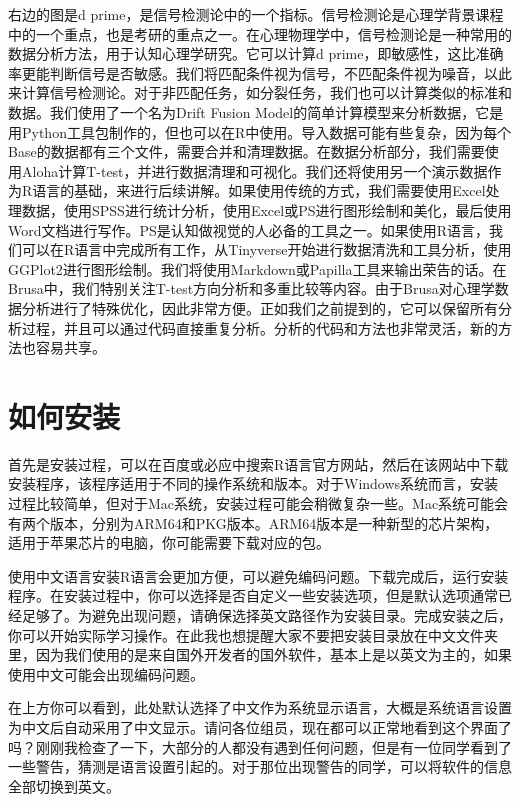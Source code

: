 \documentclass[
  oneside]{book}
\begin{document}
右边的图是d
prime，是信号检测论中的一个指标。信号检测论是心理学背景课程中的一个重点，也是考研的重点之一。在心理物理学中，信号检测论是一种常用的数据分析方法，用于认知心理学研究。它可以计算d
prime，即敏感性，这比准确率更能判断信号是否敏感。我们将匹配条件视为信号，不匹配条件视为噪音，以此来计算信号检测论。对于非匹配任务，如分裂任务，我们也可以计算类似的标准和数据。我们使用了一个名为Drift
Fusion
Model的简单计算模型来分析数据，它是用Python工具包制作的，但也可以在R中使用。导入数据可能有些复杂，因为每个Base的数据都有三个文件，需要合并和清理数据。在数据分析部分，我们需要使用Aloha计算T-test，并进行数据清理和可视化。我们还将使用另一个演示数据作为R语言的基础，来进行后续讲解。如果使用传统的方式，我们需要使用Excel处理数据，使用SPSS进行统计分析，使用Excel或PS进行图形绘制和美化，最后使用Word文档进行写作。PS是认知做视觉的人必备的工具之一。如果使用R语言，我们可以在R语言中完成所有工作，从Tinyverse开始进行数据清洗和工具分析，使用GGPlot2进行图形绘制。我们将使用Markdown或Papilla工具来输出荣告的话。在Brusa中，我们特别关注T-test方向分析和多重比较等内容。由于Brusa对心理学数据分析进行了特殊优化，因此非常方便。正如我们之前提到的，它可以保留所有分析过程，并且可以通过代码直接重复分析。分析的代码和方法也非常灵活，新的方法也容易共享。

\hypertarget{2-install-R}{%
\section{如何安装}\label{2-install-R}}

首先是安装过程，可以在百度或必应中搜索R语言官方网站，然后在该网站中下载安装程序，该程序适用于不同的操作系统和版本。对于Windows系统而言，安装过程比较简单，但对于Mac系统，安装过程可能会稍微复杂一些。Mac系统可能会有两个版本，分别为ARM64和PKG版本。ARM64版本是一种新型的芯片架构，适用于苹果芯片的电脑，你可能需要下载对应的包。

使用中文语言安装R语言会更加方便，可以避免编码问题。下载完成后，运行安装程序。在安装过程中，你可以选择是否自定义一些安装选项，但是默认选项通常已经足够了。为避免出现问题，请确保选择英文路径作为安装目录。完成安装之后，你可以开始实际学习操作。在此我也想提醒大家不要把安装目录放在中文文件夹里，因为我们使用的是来自国外开发者的国外软件，基本上是以英文为主的，如果使用中文可能会出现编码问题。

在上方你可以看到，此处默认选择了中文作为系统显示语言，大概是系统语言设置为中文后自动采用了中文显示。请问各位组员，现在都可以正常地看到这个界面了吗？刚刚我检查了一下，大部分的人都没有遇到任何问题，但是有一位同学看到了一些警告，猜测是语言设置引起的。对于那位出现警告的同学，可以将软件的信息全部切换到英文。
\end{document}
